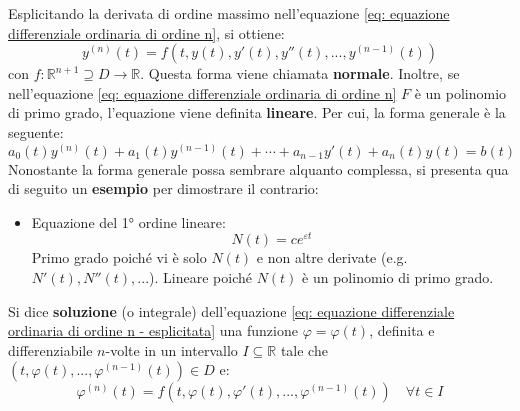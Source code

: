 \documentclass[a4paper]{article}
\newcommand{\definition}[1]{\textcolor{Red3}{\textbf{#1}}}
\newcommand{\example}[1]{\textcolor{Green4}{\textbf{#1}}}
\begin{document}
	\noindent
	Esplicitando la derivata di ordine massimo nell'equazione \ref{eq: equazione differenziale ordinaria di ordine n}, si ottiene:
	\begin{equation}\label{eq: equazione differenziale ordinaria di ordine n - esplicitata}
		y^{\left(n\right)}\left(t\right) = f\left(t, y\left(t\right), y'\left(t\right), y''\left(t\right), ..., y^{\left(n-1\right)}\left(t\right)\right)
	\end{equation}
	con $f:\mathbb{R}^{n+1} \supseteq D \rightarrow \mathbb{R}$. Questa forma viene chiamata \definition{normale}. Inoltre, se nell'equazione \ref{eq: equazione differenziale ordinaria di ordine n} $F$ è un polinomio di primo grado, l'equazione viene definita \definition{lineare}. Per cui, la forma generale è la seguente:
	\begin{equation}
		a_{0}\left(t\right)y^{\left(n\right)}\left(t\right) + a_{1}\left(t\right)y^{\left(n-1\right)}\left(t\right) + \cdots + a_{n-1}y'\left(t\right) + a_{n}\left(t\right)y\left(t\right) = b\left(t\right)
	\end{equation}
	Nonostante la forma generale possa sembrare alquanto complessa, si presenta qua di seguito un \example{esempio} per dimostrare il contrario:
	\begin{itemize}
		\item Equazione del 1° ordine lineare:
		\begin{equation*}
			N\left(t\right) = ce^{\varepsilon t}
		\end{equation*}
		Primo grado poiché vi è solo $N\left(t\right)$ e non altre derivate (e.g. $N'\left(t\right), N''\left(t\right), ...$). Lineare poiché $N\left(t\right)$ è un polinomio di primo grado.
	\end{itemize}
	\begin{boxdef}
		Si dice \definition{soluzione} (o integrale) dell'equazione \ref{eq: equazione differenziale ordinaria di ordine n - esplicitata} una funzione $\varphi = \varphi\left(t\right)$, definita e differenziabile $n$-volte in un intervallo $I \subseteq \mathbb{R}$ tale che $\left(t, \varphi\left(t\right), ..., \varphi^{\left(n-1\right)}\left(t\right)\right) \in D$ e:
		\begin{equation}\label{eq: soluzione dell'equazione}
			\varphi^{\left(n\right)}\left(t\right) = f\left(t, \varphi\left(t\right), \varphi'\left(t\right), ..., \varphi^{\left(n-1\right)}\left(t\right)\right) \hspace{1em} \forall t \in I
		\end{equation}
	\end{boxdef}
\end{document}

